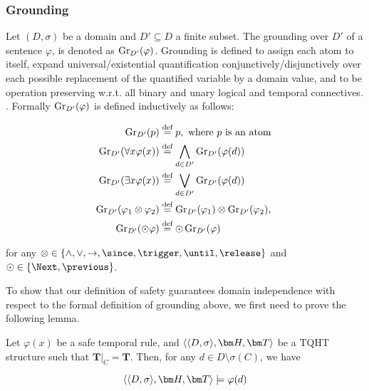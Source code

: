 \subsubsection{Grounding}

Let $(D,\sigma)$ be a domain and $D'\subseteq D$ a finite subset. The
grounding over $D'$ of a sentence $\varphi$, is denoted as
$\operatorname{Gr}_{D'}(\varphi)$. Grounding is defined to assign each atom to
itself, expand universal/existential quantification
conjunctively/disjunctively over each possible replacement of the
quantified variable by a domain value, and to be operation preserving
w.r.t. all binary and unary logical and temporal
connectives. \cite{agcapevidi17a}. Formally
$\operatorname{Gr}_{D^{\prime}}(\varphi)$ is defined inductively as follows:

\begin{align*}
  \operatorname{Gr}_{D^{\prime}}(p) & \stackrel{\text{def}}{=} p, \text { where } p \text { is an atom } \\
  \operatorname{Gr}_{D^{\prime}}(\forall x \varphi(x)) & \stackrel{\text{def}}{=} \bigwedge_{d \in D^{\prime}} \operatorname{Gr}_{D^{\prime}}(\varphi(d)) \\
  \operatorname{Gr}_{D^{\prime}}(\exists x \varphi(x)) & \stackrel{\text{def}}{=} \bigvee_{d \in D^{\prime}} \operatorname{Gr}_{D^{\prime}}(\varphi(d)) \\
  \operatorname{Gr}_{D^{\prime}}(\varphi_1 \otimes \varphi_2) & \stackrel{\text{def}}{=} \operatorname{Gr}_{D^{\prime}}(\varphi_1) \otimes \operatorname{Gr}_{D^{\prime}}(\varphi_2), \\
  \operatorname{Gr}_{D^{\prime}}(\odot \varphi) & \stackrel{\text{def}}{=} \odot \operatorname{Gr}_{D^{\prime}}(\varphi) \\
\end{align*}

for any
$\otimes \in \{ \land, \lor, \rightarrow, \since, \trigger, \until,
\release \}$ and $\odot \in \{ \Next, \previous \}$.

To show that our definition of safety guarantees domain independence
with respect to the formal definition of grounding above, we first
need to prove the following lemma.

\begin{lemma}\label{lemma:not-imsigma-domain-sat}
  Let $\varphi(x)$ be a safe temporal rule, and $\qthandt$ be a TQHT
  structure such that $\bm{T}\vert_{C}=\bm{T}$. Then, for any
  $d \in D \setminus \sigma(C)$, we have

  \begin{equation*}
    \qthandt \models \varphi(d)
  \end{equation*}
  
\end{lemma}

